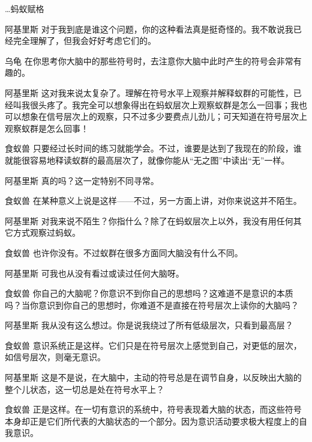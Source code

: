 \begin{dialog}{…蚂蚁赋格}
\begin{dialogue}
\item[阿基里斯]对于我到底是谁这个问题，你的这种看法真是挺奇怪的。我不敢说我已经完全理解了，但我会好好考虑它们的。

\item[乌龟]在你思考你大脑中的那些符号时，去注意你大脑中此时产生的符号会非常有趣的。

\item[阿基里斯]这对我来说太复杂了。理解在符号水平上观察并解释蚁群的可能性，已经叫我很头疼了。我完全可以想象得出在蚂蚁层次上观察蚁群是怎么一回事；我也可以想象在信号层次上的观察，只不过多少要费点儿劲儿；可天知道在符号层次上观察蚁群是怎么回事！

\item[食蚁兽]只要经过长时间的练习就能学会。不过，谁要是达到了我现在的阶段，谁就能很容易地释读蚁群的最高层次了，就像你能从“无之图”中读出“无”一样。

\item[阿基里斯]真的吗？这一定特别不同寻常。

\item[食蚁兽]在某种意义上说是这样——不过，另一方面上讲，对你来说这并不陌生。

\item[阿基里斯]对我来说不陌生？你指什么？除了在蚂蚁层次上以外，我没有用任何其它方式观察过蚂蚁。

\item[食蚁兽]也许你没有。不过蚁群在很多方面同大脑没有什么不同。

\item[阿基里斯]可我也从没有看过或读过任何大脑呀。

\item[食蚁兽]你自己的大脑呢？你意识不到你自己的思想吗？这难道不是意识的本质吗？当你意识到你自己的思想时，你难道不是直接在符号层次上读你的大脑吗？

\item[阿基里斯]我从没有这么想过。你是说我绕过了所有低级层次，只看到最高层？

\item[食蚁兽]意识系统正是这样。它们只是在符号层次上感觉到自己，对更低的层次，如信号层次，则毫无意识。

\item[阿基里斯]这是不是说，在大脑中，主动的符号总是在调节自身，以反映出大脑的整个儿状态，这一切总是处在符号水平上？

\item[食蚁兽]正是这样。在一切有意识的系统中，符号表现着大脑的状态，而这些符号本身却正是它们所代表的大脑状态的一个部分。因为意识活动要求极大程度上的自我意识。


\end{dialogue}
\end{dialog}
